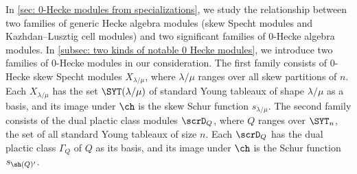 \documentclass[12pt, reqno]{amsart}
\theoremstyle{plain}
\theoremstyle{definition}
\numberwithin{equation}{section}
\numberwithin{figure}{section}
\numberwithin{table}{section}
\begin{document}
In \cref{sec: 0-Hecke modules from specializations}, we study the relationship between two families of generic Hecke algebra modules (skew Specht modules and Kazhdan--Lusztig cell modules) and two significant families of $0$-Hecke algebra modules.
In \cref{subsec: two kinds of notable 0 Hecke modules}, we introduce two  families of  $0$-Hecke modules in our consideration.
The first family consists of $0$-Hecke skew Specht modules $X_{\lambda/\mu}$, where $\lambda/\mu$ ranges over all skew partitions of $n$.
Each $X_{\lambda/\mu}$ has the set $\SYT(\lambda/\mu)$ of standard Young tableaux of shape $\lambda/\mu$ as a basis, and its image under $\ch$ is the skew Schur function $s_{\lambda/\mu}$.
The second family consists of the dual plactic class modules $\scrD_Q$, where  $Q$ ranges over $\SYT_n$, the set  of all standard Young tableaux of size $n$.
Each $\scrD_Q$ has the dual plactic class $\Gamma_Q$ of $Q$ as its basis, and its image under $\ch$ is the Schur function $s_{\sh(Q)'}$.
\end{document}
